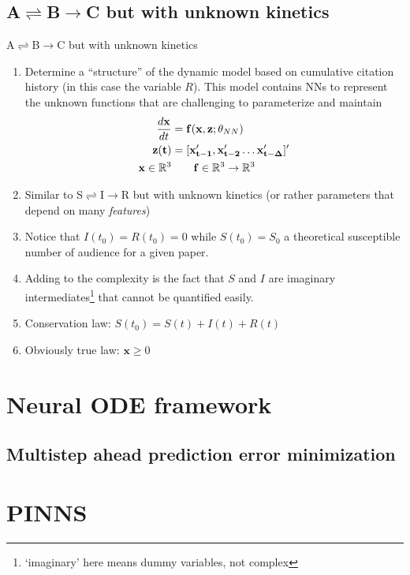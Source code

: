 \documentclass[dvipsnames, 9pt]{beamer}
\begin{document}
\subsection{A$\rightleftharpoons$B$\rightarrow$C but with unknown kinetics}
\begin{frame}{A$\rightleftharpoons$B$\rightarrow$C but with unknown kinetics}
  \begin{block}{}
    \begin{enumerate}
\item Determine a ``structure'' of the dynamic model based 
on cumulative citation history (in this case the variable $R$). This model contains NNs 
to represent the unknown functions that are challenging to parameterize 
and maintain
\begin{align*}
\dfrac{d \mathbf{x}}{d t} &= \mathbf{f}(\mathbf{x, z}; \theta_{NN}) \\
\mathbf{z(t)} &= [\mathbf{x'_{t-1},x'_{t-2} \ldots x'_{t-\Delta}}]'\\
\mathbf{x} \in \mathbb{R}^3 &\qquad \mathbf{f} \in \mathbb{R}^3 \rightarrow \mathbb{R}^3
\end{align*}
\item Similar to S$\rightleftharpoons$I$\rightarrow$R but with unknown kinetics (or rather parameters that depend on many \textit{features})
\item Notice that $I(t_0) = R(t_0) = 0$ while $S(t_0) = S_0$ a theoretical susceptible number of audience for a given paper.
\item Adding to the complexity is the fact that $S$ and $I$ are imaginary intermediates\footnote{\tiny{`imaginary' here means dummy variables, not complex}} that cannot be quantified easily.
\item Conservation law: $S(t_0) = S(t) + I(t) + R(t)$
\item Obviously  true law: $\mathbf{x} \geq 0$
\end{enumerate}
  \end{block}
\end{frame}
\section{Neural ODE framework}
\subsection{Multistep ahead prediction error minimization}
\section{PINNS}
\end{document}
